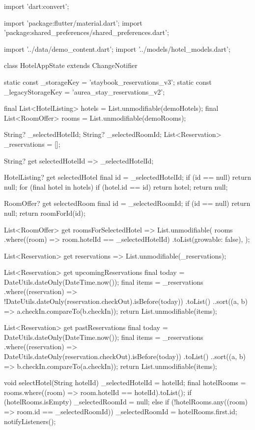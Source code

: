 \documentclass[11pt,a4paper]{article}
\begin{document}
\begin{codeblock}
import 'dart:convert';

import 'package:flutter/material.dart';
import 'package:shared_preferences/shared_preferences.dart';

import '../data/demo_content.dart';
import '../models/hotel_models.dart';

class HotelAppState extends ChangeNotifier {
  static const _storageKey = 'staybook_reservations_v3';
  static const _legacyStorageKey = 'aurea_stay_reservations_v2';

  final List<HotelListing> hotels = List.unmodifiable(demoHotels);
  final List<RoomOffer> rooms = List.unmodifiable(demoRooms);

  String? _selectedHotelId;
  String? _selectedRoomId;
  List<Reservation> _reservations = [];

  String? get selectedHotelId => _selectedHotelId;

  HotelListing? get selectedHotel {
    final id = _selectedHotelId;
    if (id == null) {
      return null;
    }
    for (final hotel in hotels) {
      if (hotel.id == id) {
        return hotel;
      }
    }
    return null;
  }

  RoomOffer? get selectedRoom {
    final id = _selectedRoomId;
    if (id == null) {
      return null;
    }
    return roomForId(id);
  }

  List<RoomOffer> get roomsForSelectedHotel => List.unmodifiable(
        rooms
            .where((room) => room.hotelId == _selectedHotelId)
            .toList(growable: false),
      );

  List<Reservation> get reservations => List.unmodifiable(_reservations);

  List<Reservation> get upcomingReservations {
    final today = DateUtils.dateOnly(DateTime.now());
    final items = _reservations
        .where((reservation) =>
            !DateUtils.dateOnly(reservation.checkOut).isBefore(today))
        .toList()
      ..sort((a, b) => a.checkIn.compareTo(b.checkIn));
    return List.unmodifiable(items);
  }

  List<Reservation> get pastReservations {
    final today = DateUtils.dateOnly(DateTime.now());
    final items = _reservations
        .where((reservation) =>
            DateUtils.dateOnly(reservation.checkOut).isBefore(today))
        .toList()
      ..sort((a, b) => b.checkIn.compareTo(a.checkIn));
    return List.unmodifiable(items);
  }

  void selectHotel(String hotelId) {
    _selectedHotelId = hotelId;
    final hotelRooms = rooms.where((room) => room.hotelId == hotelId).toList();
    if (hotelRooms.isEmpty) {
      _selectedRoomId = null;
    } else if (!hotelRooms.any((room) => room.id == _selectedRoomId)) {
      _selectedRoomId = hotelRooms.first.id;
    }
    notifyListeners();
  }

}
\end{codeblock}
\end{document}
